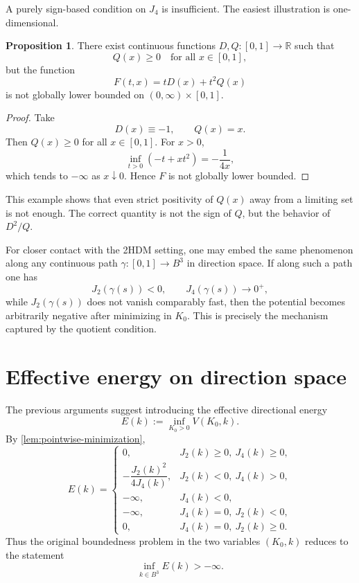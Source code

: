 \documentclass[11pt,a4paper]{article}
\theoremstyle{definition}
\newtheorem{proposition}[theorem]{Proposition}
\theoremstyle{remark}
\begin{document}
A purely sign-based condition on $J_4$ is insufficient. The easiest illustration is one-dimensional.

\begin{proposition}\label{prop:one-dimensional-counterexample}
There exist continuous functions $D,Q:[0,1]\to\mathbb{R}$ such that
\[
Q(x)\ge0\quad\text{for all }x\in[0,1],
\]
but the function
\[
F(t,x)=tD(x)+t^2Q(x)
\]
is not globally lower bounded on $(0,\infty)\times[0,1]$.
\end{proposition}

\begin{proof}
Take
\[
D(x)\equiv -1,\qquad Q(x)=x.
\]
Then $Q(x)\ge0$ for all $x\in[0,1]$. For $x>0$,
\[
\inf_{t>0}(-t+xt^2)=-\frac{1}{4x},
\]
which tends to $-\infty$ as $x\downarrow0$. Hence $F$ is not globally lower bounded.
\end{proof}

This example shows that even strict positivity of $Q(x)$ away from a limiting set is not enough. The correct quantity is not the sign of $Q$, but the behavior of $D^2/Q$.

For closer contact with the 2HDM setting, one may embed the same phenomenon along any continuous path $\gamma:[0,1]\to B^3$ in direction space. If along such a path one has
\[
J_2(\gamma(s))<0,\qquad J_4(\gamma(s))\to0^+,
\]
while $J_2(\gamma(s))$ does not vanish comparably fast, then the potential becomes arbitrarily negative after minimizing in $K_0$. This is precisely the mechanism captured by the quotient condition.

\section{Effective energy on direction space}

The previous arguments suggest introducing the effective directional energy
\begin{equation}\label{eq:effective-energy-2hdm}
E(k):=\inf_{K_0>0}V(K_0,k).
\end{equation}
By \cref{lem:pointwise-minimization},
\[
E(k)=
\begin{cases}
0, & J_2(k)\ge0,\ J_4(k)\ge0,\\[1ex]
-\dfrac{J_2(k)^2}{4J_4(k)}, & J_2(k)<0,\ J_4(k)>0,\\[2ex]
-\infty, & J_4(k)<0,\\[1ex]
-\infty, & J_4(k)=0,\ J_2(k)<0,\\[1ex]
0, & J_4(k)=0,\ J_2(k)\ge0.
\end{cases}
\]
Thus the original boundedness problem in the two variables $(K_0,k)$ reduces to the statement
\[
\inf_{k\in B^3}E(k)>-\infty.
\]
\end{document}
